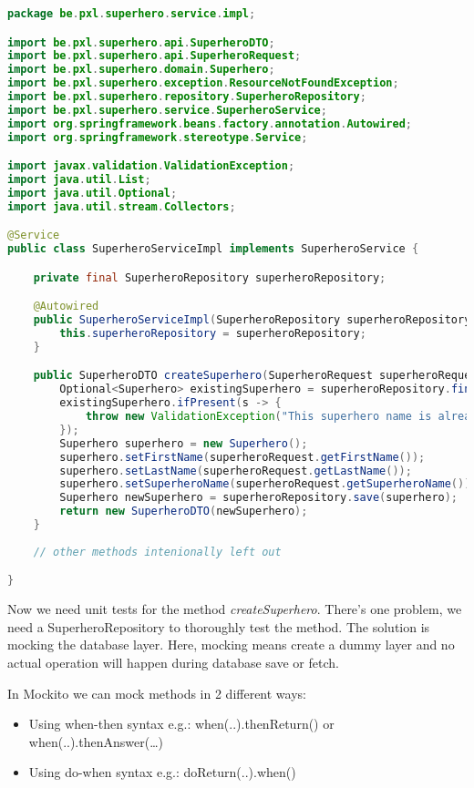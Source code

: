 \begin{lstlisting}[frame=single, language=java]
package be.pxl.superhero.service.impl;

import be.pxl.superhero.api.SuperheroDTO;
import be.pxl.superhero.api.SuperheroRequest;
import be.pxl.superhero.domain.Superhero;
import be.pxl.superhero.exception.ResourceNotFoundException;
import be.pxl.superhero.repository.SuperheroRepository;
import be.pxl.superhero.service.SuperheroService;
import org.springframework.beans.factory.annotation.Autowired;
import org.springframework.stereotype.Service;

import javax.validation.ValidationException;
import java.util.List;
import java.util.Optional;
import java.util.stream.Collectors;

@Service
public class SuperheroServiceImpl implements SuperheroService {

	private final SuperheroRepository superheroRepository;

	@Autowired
	public SuperheroServiceImpl(SuperheroRepository superheroRepository) {
		this.superheroRepository = superheroRepository;
	}

	public SuperheroDTO createSuperhero(SuperheroRequest superheroRequest) {
		Optional<Superhero> existingSuperhero = superheroRepository.findSuperheroBySuperheroName(superheroRequest.getSuperheroName());
		existingSuperhero.ifPresent(s -> {
			throw new ValidationException("This superhero name is already taken.");
		});
		Superhero superhero = new Superhero();
		superhero.setFirstName(superheroRequest.getFirstName());
		superhero.setLastName(superheroRequest.getLastName());
		superhero.setSuperheroName(superheroRequest.getSuperheroName());
		Superhero newSuperhero = superheroRepository.save(superhero);
		return new SuperheroDTO(newSuperhero);
	}
	
	// other methods intenionally left out

}
\end{lstlisting}


Now we need unit tests for the method \textit{createSuperhero}. There's one problem, we need a SuperheroRepository to thoroughly test the method.  The solution is mocking the database layer. Here,  mocking means create a dummy layer and no actual operation will happen during database save or fetch. 

In Mockito we can mock methods in 2 different ways:

\begin{itemize}
\item Using when-then syntax e.g.: when(..).thenReturn() or when(..).thenAnswer(…)
\item Using do-when syntax e.g.: doReturn(..).when()
\end{itemize}

